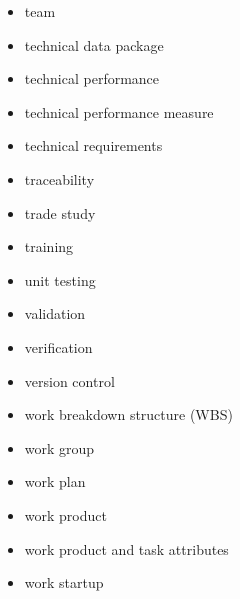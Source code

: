 \begin{itemize}
\item team
\item technical data package
\item technical performance
\item technical performance measure
\item technical requirements
\item traceability
\item trade study
\item training
\item unit testing
\item validation
\item verification
\item version control
\item work breakdown structure (WBS)
\item work group
\item work plan
\item work product
\item work product and task attributes
\item work startup
\end{itemize}